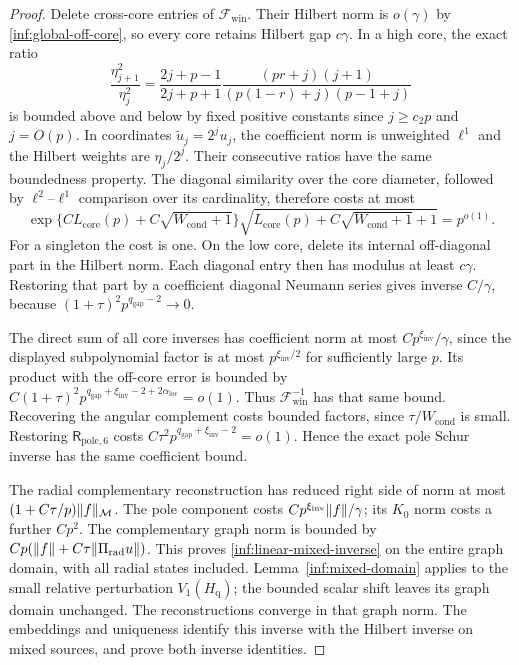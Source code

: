 \begin{proof}
Delete cross-core entries of
$\mathcal F_{\mathrm{win}}$. Their Hilbert norm is $o(\gamma)$ by
\eqref{inf:global-off-core}, so every core retains Hilbert gap
$c\gamma$. In a high core, the exact ratio
\begin{equation}\label{inf:core-conditioning}
 \frac{\eta_{j+1}^2}{\eta_j^2}
 =\frac{2j+p-1}{2j+p+1}
   \frac{(pr+j)(j+1)}{(p(1-r)+j)(p-1+j)}
\end{equation}
is bounded above and below by fixed positive constants since
$j\ge c_2p$ and $j=O(p)$. In coordinates
$\widetilde u_j=2^ju_j$, the coefficient norm is unweighted
$\ell^1$ and the Hilbert weights are $\eta_j/2^j$.
Their consecutive ratios have the same boundedness property.
The diagonal similarity over the core diameter, followed by
$\ell^2$--$\ell^1$ comparison over its cardinality, therefore costs at most
\[
 \exp\{C L_{\mathrm{core}}(p)+C\sqrt{W_{\mathrm{cond}}+1}\}
 \sqrt{L_{\mathrm{core}}(p)+C\sqrt{W_{\mathrm{cond}}+1}+1}
 =p^{o(1)}.
\]
For a singleton the cost is one. On the low core, delete its
internal off-diagonal part in the Hilbert norm. Each diagonal
entry then has modulus at least $c\gamma$. Restoring that part
by a coefficient diagonal Neumann series gives inverse $C/\gamma$,
because $(1+\tau)^2p^{q_{\mathrm{gap}}-2}\to0$.

The direct sum of all core inverses has coefficient norm at most
$Cp^{\xi_{\mathrm{inv}}}/\gamma$, since the displayed subpolynomial
factor is at most $p^{\xi_{\mathrm{inv}}/2}$ for sufficiently large $p$. Its product with the off-core error is bounded by
$C(1+\tau)^2p^{q_{\mathrm{gap}}+\xi_{\mathrm{inv}}-2+2\alpha_{\mathrm{loc}}}=o(1)$.
Thus $\mathcal F_{\mathrm{win}}^{-1}$ has that same bound.
Recovering the angular complement costs bounded factors, since
$\tau/W_{\mathrm{cond}}$ is small. Restoring
$\mathsf R_{\mathrm{pole},6}$ costs
$C\tau^2p^{q_{\mathrm{gap}}+\xi_{\mathrm{inv}}-2}=o(1)$.
Hence the exact pole Schur inverse has the same coefficient bound.

The radial complementary reconstruction has reduced right side
of norm at most $(1+C\tau/p)\lVert f\rVert_{\mathcal M}$.
The pole component costs $Cp^{\xi_{\mathrm{inv}}}\lVert f\rVert/\gamma$;
its $K_0$ norm costs a further $Cp^2$.
The complementary graph norm is bounded by
$Cp(\lVert f\rVert+C\tau\lVert \Pi_{\mathrm{rad}}u\rVert)$.
This proves \eqref{inf:linear-mixed-inverse} on the entire graph
domain, with all radial states included. Lemma~\ref{inf:mixed-domain}
applies to the small relative perturbation $V_1(H_{\mathrm q})$;
the bounded scalar shift leaves its graph domain unchanged.
The reconstructions converge in that graph norm. The embeddings and
uniqueness identify this inverse with the Hilbert inverse on
mixed sources, and prove both inverse identities.


\end{proof}
